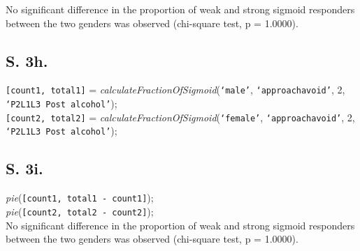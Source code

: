 \documentclass{article}
\begin{document}
No significant difference in the proportion of weak and strong sigmoid responders between the two genders was observed (chi-square test, p = 1.0000).

\subsection{S. 3h.}
\texttt{[count1, total1]} = \emph{calculateFractionOfSigmoid}(\texttt{`male'}, \texttt{`approachavoid'}, 2, \texttt{`P2L1L3 Post alcohol'});\\
\texttt{[count2, total2]} = \emph{calculateFractionOfSigmoid}(\texttt{`female'}, \texttt{`approachavoid'}, 2, \texttt{`P2L1L3 Post alcohol'});\\

\subsection{S. 3i.}
\emph{pie}(\texttt{[count1, total1 - count1]});\\
\emph{pie}(\texttt{[count2, total2 - count2]});\\

No significant difference in the proportion of weak and strong sigmoid responders between the two genders was observed (chi-square test, p = 1.0000).
\end{document}
